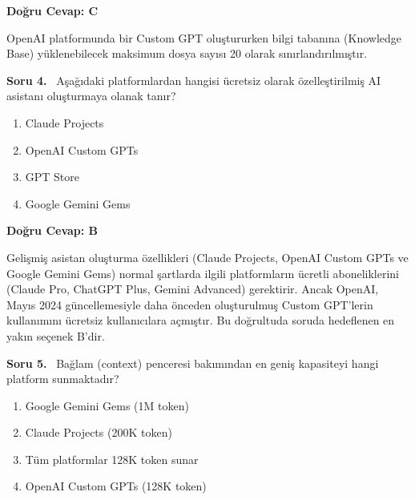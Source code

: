 \documentclass[11pt,a4paper,openany]{book}
\begin{document}
\vspace{4pt}
\begin{tcolorbox}[title=Cevap ve Açıklama, colback=gray!3!white, colframe=primarycolor!90!black, arc=2mm, fonttitle=\bfseries\sffamily, top=6pt, bottom=6pt]
    \textbf{Doğru Cevap: C}

    \vspace{2pt}
    OpenAI platformunda bir Custom GPT oluştururken bilgi tabanına (Knowledge Base) yüklenebilecek maksimum dosya sayısı 20 olarak sınırlandırılmıştır.
\end{tcolorbox}
\vspace{10pt}
\needspace{5cm}
\vspace{8pt}
\noindent\textbf{\large\sffamily Soru 4.} \ Aşağıdaki platformlardan hangisi ücretsiz olarak özelleştirilmiş AI asistanı oluşturmaya olanak tanır?

\begin{enumerate}[label=\Alph*), leftmargin=25pt, topsep=4pt, itemsep=2pt]
        \item Claude Projects
        \item OpenAI Custom GPTs
        \item GPT Store
        \item Google Gemini Gems
\end{enumerate}

\vspace{4pt}
\begin{tcolorbox}[title=Cevap ve Açıklama, colback=gray!3!white, colframe=primarycolor!90!black, arc=2mm, fonttitle=\bfseries\sffamily, top=6pt, bottom=6pt]
    \textbf{Doğru Cevap: B}

    \vspace{2pt}
    Gelişmiş asistan oluşturma özellikleri (Claude Projects, OpenAI Custom GPTs ve Google Gemini Gems) normal şartlarda ilgili platformların ücretli aboneliklerini (Claude Pro, ChatGPT Plus, Gemini Advanced) gerektirir. Ancak OpenAI, Mayıs 2024 güncellemesiyle daha önceden oluşturulmuş Custom GPT'lerin kullanımını ücretsiz kullanıcılara açmıştır. Bu doğrultuda soruda hedeflenen en yakın seçenek B'dir.
\end{tcolorbox}
\vspace{10pt}
\needspace{5cm}
\vspace{8pt}
\noindent\textbf{\large\sffamily Soru 5.} \ Bağlam (context) penceresi bakımından en geniş kapasiteyi hangi platform sunmaktadır?

\begin{enumerate}[label=\Alph*), leftmargin=25pt, topsep=4pt, itemsep=2pt]
        \item Google Gemini Gems (1M token)
        \item Claude Projects (200K token)
        \item Tüm platformlar 128K token sunar
        \item OpenAI Custom GPTs (128K token)
\end{enumerate}
\end{document}
